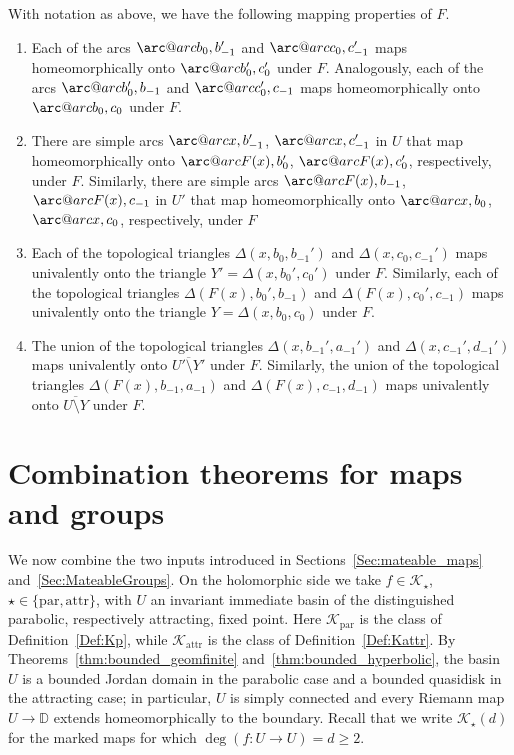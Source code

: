 \documentclass[11pt,a4paper, oneside]{amsart}
\makeatletter
\theoremstyle{definition}
\theoremstyle{remark}
\numberwithin{equation}{section}
\renewcommand{\ge}{\geqslant}
\newcommand{\arc@char}{{\usefont{U}{tipa}{m}{n}\symbol{62}}}%
\newcommand{\arc}[1]{\mathpalette\arc@arc{#1}}
\newcommand{\arc@arc}[2]{%
  \sbox0{$\m@th#1#2$}%
  \vbox{
    \hbox{\resizebox{\wd0}{\height}{\arc@char}}
    \nointerlineskip
    \box0
  }%
}
\newcommand{\Kstar}{{\mathscr K_\star}}
\newcommand{\parab}{{\text{par}}}
\newcommand{\attr}{{\text{attr}}}
\newcommand{\disk}{\mathbb{D}}
\makeatother
\begin{document}
With notation as above, we have the following mapping properties of $F$. 
\begin{enumerate}[leftmargin=8mm]
    \item Each of the arcs $\arc{b_0,b_{-1}'}$ and $\arc{c_0,c_{-1}'}$ maps homeomorphically onto $\arc{b_0',c_0'}$ under $F$. Analogously, each of the arcs $\arc{b_0',b_{-1}}$ and $\arc{c_0',c_{-1}}$ maps homeomorphically onto $\arc{b_0,c_0}$ under $F$.
    \item There are simple arcs $\arc{x,b_{-1}'}$, $\arc{x,c_{-1}'}$ in $U$ that map homeomorphically onto $\arc{F(x),b_0'}$, $\arc{F(x),c_0'}$, respectively, under $F$. Similarly, there are simple arcs $\arc{F(x),b_{-1}}$, $\arc{F(x),c_{-1}}$ in $U'$ that map homeomorphically onto $\arc{x,b_0}$, $\arc{x,c_0}$, respectively, under $F$
    \item Each of the topological triangles $\Delta (x,b_0,b_{-1}')$ and $\Delta (x,c_0,c_{-1}')$ maps univalently onto the triangle $Y'=\Delta (x,b_0',c_0')$ under $F$.
    Similarly, each of the topological triangles $\Delta (F(x),b_0',b_{-1})$ and $\Delta (F(x),c_0',c_{-1})$ maps univalently onto the triangle $Y=\Delta (x,b_0,c_0)$ under $F$.
    \item The union of the topological triangles $\Delta (x,b_{-1}',a_{-1}')$ and $\Delta (x,c_{-1}',d_{-1}')$ maps univalently onto $\overline{U'\setminus Y'}$ under $F$. Similarly, the union of the topological triangles $\Delta (F(x),b_{-1},a_{-1})$ and $\Delta (F(x),c_{-1},d_{-1})$ maps univalently onto $\overline{U\setminus Y}$ under $F$.
\end{enumerate}

\section{Combination theorems for maps and groups}
\label{Sec:Combination}

We now combine the two inputs introduced in Sections~\ref{Sec:mateable_maps} and~\ref{Sec:MateableGroups}. On the holomorphic side we take $f\in\Kstar$, $\star\in\{\parab,\attr\}$, with $U$ an invariant immediate basin of the distinguished parabolic, respectively attracting, fixed point. Here $\mathscr K_\parab$ is the class of Definition~\ref{Def:Kp}, while $\mathscr K_\attr$ is the class of Definition~\ref{Def:Kattr}. By Theorems~\ref{thm:bounded_geomfinite} and~\ref{thm:bounded_hyperbolic}, the basin $U$ is a bounded Jordan domain in the parabolic case and a bounded quasidisk in the attracting case; in particular, $U$ is simply connected and every Riemann map $U\to\disk$ extends homeomorphically to the boundary. Recall that we write $\Kstar(d)$ for the marked maps for which $\deg(f \colon U\to U)=d\ge2$.
\end{document}
